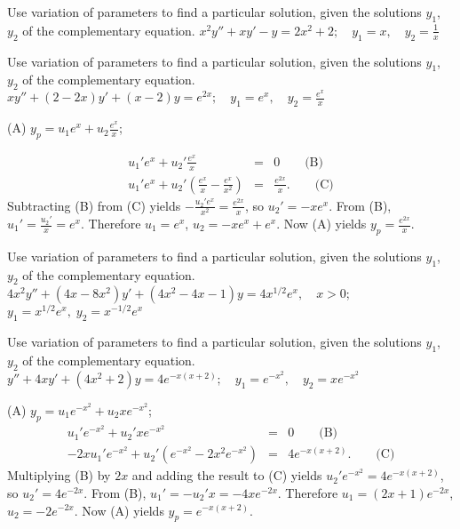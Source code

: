 \documentclass{ximera}
\begin{document}
\begin{problem}\label{exer:5.7.7}
Use variation
of parameters to find a particular solution, given the solutions
$y_1$, $y_2$ of the complementary equation. $x^2y''+xy'- y=2x^2+2;   \quad y_1=x,
\quad y_2=\frac{1}{x}$
\end{problem}

\begin{problem}\label{exer:5.7.8}
Use variation
of parameters to find a particular solution, given the solutions
$y_1$, $y_2$ of the complementary equation. $xy''+(2-2x)y'+(x-2)y=e^{2x};   \quad y_1=e^x,
\quad y_2=\frac{e^x}{x}$

\begin{solution}
(A) $y_p=u_1e^x+u_2\frac{e^x}{x}$;

\begin{eqnarray*}
u_1'e^x+u_2'\frac{e^x}{x}&=&0\qquad\text{(B)}\\ %
u_1'e^x+u_2'\left(\frac{e^x}{x}-\frac{e^x}{x^2}\right)&=&\frac{e^{2x}}{x}.\qquad\text{(C)} %
\end{eqnarray*}
Subtracting (B) from (C) yields
$-\frac{u_2'e^x}{x^2}=\frac{e^{2x}}{x}$, so $u_2'=-xe^x$. From
(B), $u_1'=\frac{u_2'}{x}=e^x$. Therefore
$u_1=e^x$, $u_2=-xe^x+e^x$. Now (A) yields $y_p=\frac{e^{2x}}{x}$.
\end{solution}
\end{problem}

\begin{problem}\label{exer:5.7.9}
Use variation
of parameters to find a particular solution, given the solutions
$y_1$, $y_2$ of the complementary equation. $4x^2y''+(4x-8x^2)y'+(4x^2-4x-1)y=4x^{1/2}e^x, \quad   x > 0$;
\newline $y_1=x^{1/2} e^x,\;  y_2=x^{-1/2}e^x$
\end{problem}

\begin{problem}\label{exer:5.7.10}
Use variation
of parameters to find a particular solution, given the solutions
$y_1$, $y_2$ of the complementary equation. $y''+4xy'+(4x^2+2)y=4e^{-x(x+2)};\quad   y_1=e^{-x^2},
\quad y_2=xe^{-x^2}$

\begin{solution}
    (A) $y_p=u_1e^{-x^2}+u_2xe^{-x^2}$;
\setcounter{equation}{1}
\begin{eqnarray*}
u_1'e^{-x^2} +u_2'xe^{-x^2}&=&0\qquad\text{(B)}\\ %
-2xu_1'e^{-x^2}+u_2'(e^{-x^2}-2x^2e^{-x^2})&=
&4e^{-x(x+2)}.\qquad\text{(C)} %
\end{eqnarray*}
Multiplying (B) by $2x$ and adding the result to
(C) yields $u_2'e^{-x^2}=4e^{-x(x+2)}$, so
$u_2'=4e^{-2x}$. From (B), $u_1'=-u_2'x=-4xe^{-2x}$.
Therefore $u_1=(2x+1)e^{-2x}$, $u_2=-2e^{-2x}$. Now (A) yields
$y_p=e^{-x(x+2)}$.

\end{solution}
\end{problem}
\end{document}
